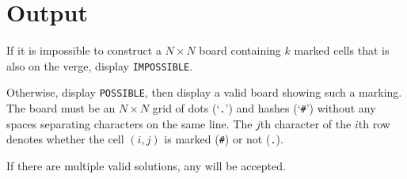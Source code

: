 \section*{Output}

If it is impossible to construct a $N \times N$ board containing $k$ marked cells that is also on the verge, display \texttt{IMPOSSIBLE}.

Otherwise, display \texttt{POSSIBLE}, then display a valid board showing such a marking. The board must be an $N \times N$ grid of dots (`\texttt{.}') and hashes (`\texttt{\#}') without any spaces separating characters on the same line. The $j$th character of the $i$th row denotes whether the cell $(i, j)$ is marked (\texttt{\#}) or not (\texttt{.}).

If there are multiple valid solutions, any will be accepted.
